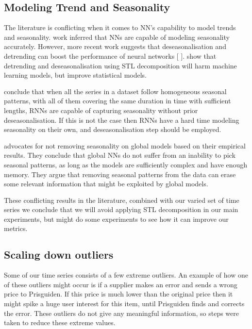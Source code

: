 \subsection{Modeling Trend and Seasonality}
\label{section:Data:Preprocessing:trend-and-seasonality}

The literature is conflicting when it comes to NN's capability to
model trends and seasonality. \cite{Sharda1992} work inferred that NNs are
capable of modeling seasonality accurately.
However, more recent work suggests that deseasonalisation and
detrending can boost the performance of neural networks [\cite{Zhang2005} \cite{Smyl2020}].
\cite{Ouyang2021} show that detrending and deseasonalisation using STL decomposition
will harm machine learning models, but improve statistical models.

\cite{Hewamalage2021} conclude that when all the series in a dataset follow
homogeneous seasonal patterns, with all of them covering the same duration in time
with sufficient lengths, RNNs are capable of capturing seasonality
without prior deseasonalisation.
If this is not the case then RNNs have a hard time modeling
seasonality on their own, and deseasonalisation step should be employed.

\cite{Montero-Manso2021} advocates for not removing seasonality on global models based on their empirical results.
They conclude that global NNs do not suffer from an inability to pick seasonal patterns,
as long as the models are sufficiently complex and have enough memory. They argue that removing
seasonal patterns from the data can erase some relevant information that might be exploited by global models.


These conflicting results in the literature, combined with our varied set of time series
we conclude that we will avoid applying STL decomposition in our main experiments,
but might do some experiments to see how it can improve our metrics.

\subsection{Scaling down outliers}
\label{section:Data:Preprocessing:scale-down-outliers}
Some of our time series consists of a few extreme outliers. An example of
how one of these outliers might occur is if a supplier makes an error and sends
a wrong price to Prisguiden. If this price is much lower than the original price then
it might spike a huge user interest for this item, until Prisguiden finds and corrects the error.
These outliers do not give any meaningful information, so steps were taken to reduce these extreme values.

